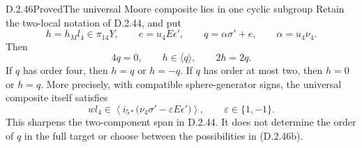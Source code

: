 \begin{claim}{D.2.46}{Proved}{The universal Moore composite lies in one cyclic subgroup}
Retain the two-local notation of D.2.44, and put
\[
 h=h_Ml_4\in\pi_{14}Y,\qquad
 e=u_4E\epsilon',\qquad
 q=\alpha\sigma'+e,\qquad \alpha=u_4\nu_4.
 \tag{D.2.46a}
\]
Then
\[
             4q=0,\qquad h\in\langle q\rangle,
             \qquad 2h=2q.
 \tag{D.2.46b}
\]
If $q$ has order four, then $h=q$ or $h=-q$.  If $q$ has
order at most two, then $h=0$ or $h=q$.  More precisely, with
compatible sphere-generator signs, the universal composite itself
satisfies
\[
 wl_4\in
 \left\langle i_{5*}\bigl(\nu_4\sigma'
                    -\varepsilon E\epsilon'\bigr)\right\rangle,
 \qquad \varepsilon\in\{1,-1\}.
 \tag{D.2.46c}
\]
This sharpens the two-component span in D.2.44.  It does not
determine the order of $q$ in the full target or choose between
the possibilities in (D.2.46b).
\end{claim}
